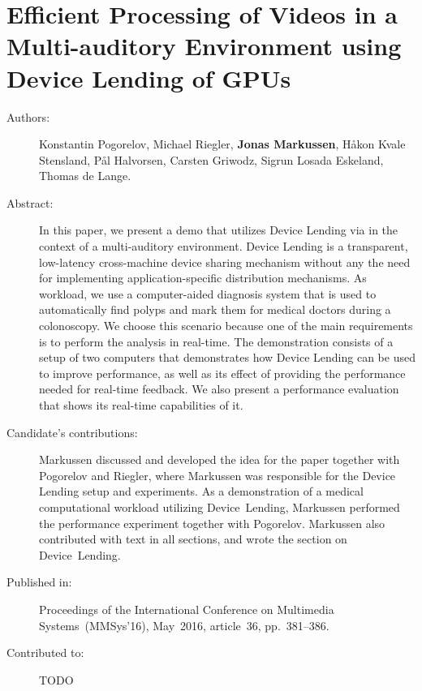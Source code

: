 \chapter{Efficient Processing of Videos in a Multi-auditory Environment using Device Lending of GPUs}
\label{paper:MMSys}
\paperthumb

\begin{description}
	\item[Authors:]
	Konstantin Pogorelov, Michael Riegler, \textbf{Jonas Markussen}, H{\aa}kon Kvale Stensland,
	P{\aa}l Halvorsen, Carsten Griwodz, Sigrun Losada Eskeland, Thomas de Lange.


	\item[Abstract:]
		In this paper, we present a demo that utilizes Device Lending 
		via  in the context of a multi-auditory
		environment. Device Lending is a transparent, low-latency
		cross-machine  device sharing mechanism without any
		the need for implementing application-specific distribution
		mechanisms. As workload, we use a computer-aided diagnosis 
		system that is used to automatically find polyps and
		mark them for medical doctors during a colonoscopy. We
		choose this scenario because one of the main requirements
		is to perform the analysis in real-time. The demonstration
		consists of a setup of two computers that demonstrates how
		Device Lending can be used to improve performance, as well
		as its effect of providing the performance needed for 
		real-time feedback. We also present a performance evaluation
		that shows its real-time capabilities of it.


	\item[Candidate's contributions:]
		Markussen discussed and developed the idea for the paper together with Pogorelov and Riegler, where Markussen was responsible for the Device Lending setup and experiments.
		As a demonstration of a medical computational workload utilizing Device~Lending,
		Markussen performed the performance experiment together with Pogorelov.
		Markussen also contributed with text in all sections, and wrote the section on Device~Lending.

	\item[Published in:]
	Proceedings of the International Conference on Multimedia Systems~(MMSys'16),
	May~2016, article~36, pp.~381--386.

	\item[Contributed to:]
		TODO

\end{description}
